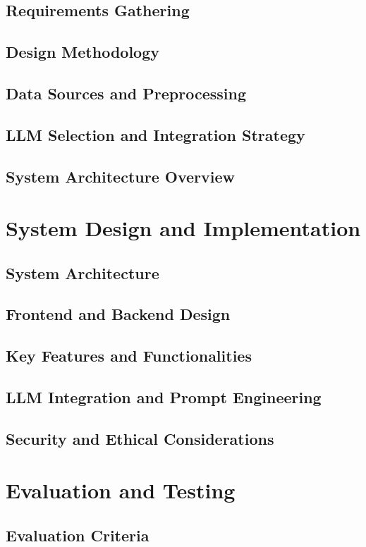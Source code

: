 \documentclass[12pt,a4paper]{report}
\begin{document}
\section{Requirements Gathering}
\section{Design Methodology}
\section{Data Sources and Preprocessing}
\section{LLM Selection and Integration Strategy}
\section{System Architecture Overview}

\chapter{System Design and Implementation}  %
\section{System Architecture}
\section{Frontend and Backend Design}
\section{Key Features and Functionalities}
\section{LLM Integration and Prompt Engineering}
\section{Security and Ethical Considerations}

\chapter{Evaluation and Testing}  %
\section{Evaluation Criteria}
\end{document}
